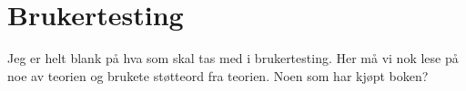 \chapter{Brukertesting}
Jeg er helt blank på hva som skal tas med i brukertesting. Her må vi nok lese på noe av teorien og brukete støtteord fra teorien. Noen som har kjøpt boken?
